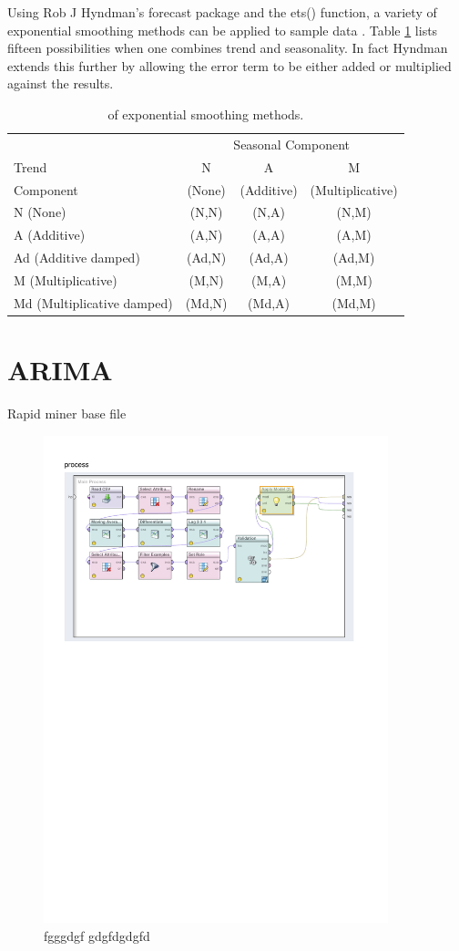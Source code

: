 Using Rob J Hyndman's forecast package and the ets() function, a variety of exponential smoothing methods can be applied to sample data \citep{Hyndman08automatictime}. Table \ref{tab:tax_em} lists fifteen possibilities when one combines trend and seasonality. In fact Hyndman extends this further by allowing the error term to be either added or multiplied against the results. 

\begin{table}[ht]
\centering
\caption[Taxonomy of exponential smoothing methods.]{of exponential smoothing methods.} 
\label{tab:tax_em}
\begin{tabular}{lccc}
  \toprule 
            & \multicolumn{3}{c}{Seasonal Component} \\
  \cmidrule(r){2-4}
  Trend     & N      & A          & M       \\ 
  Component &(None)  &(Additive)  & (Multiplicative)  \\
  \midrule 
  N (None) & (N,N)&(N,A)&(N,M)  \\ 
  A (Additive) & (A,N)&	(A,A)&(A,M)  \\ 
  Ad (Additive damped) &(Ad,N)&(Ad,A)&(Ad,M) \\ 
  M (Multiplicative) &(M,N)&(M,A)&(M,M)  \\ 
  Md (Multiplicative damped) &(Md,N)&(Md,A)&(Md,M) \\ 
   \bottomrule \end{tabular}
\end{table}

\section{ARIMA}

Rapid miner base file

\begin{figure}[tbph]
\centering
\includegraphics[width=10cm]{../Figures/chp_ts_rm_arima}
\caption[rwrew]{fgggdgf gdgfdgdgfd}
\label{fig:chp_ts_rm_arima}
\end{figure}
